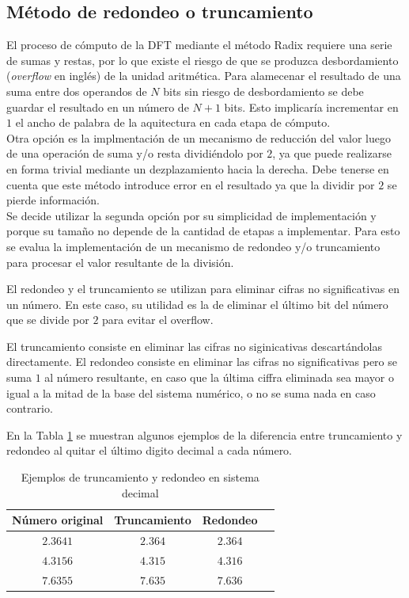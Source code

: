 \subsection{Método de redondeo o truncamiento} \label{sec:redond}

El proceso de cómputo de la DFT mediante el método Radix requiere una serie
de sumas y restas, por lo que existe el riesgo de que se produzca desbordamiento (\textit{overflow}
en inglés) de la unidad aritmética. Para alamecenar el resultado de una suma entre dos operandos de $N$ bits
sin riesgo de desbordamiento se debe guardar el resultado en un número de $N+1$ bits. Esto
implicaría incrementar en $1$ el ancho de palabra de la aquitectura en cada etapa de cómputo.\\ 
Otra opción es la implmentación de un mecanismo de reducción del valor luego de una operación de suma y/o
resta dividiéndolo por $2$, ya que puede realizarse en forma trivial mediante un dezplazamiento
hacia la derecha. Debe tenerse en cuenta que este método introduce error en el resultado ya que la
dividir por $2$ se pierde información.\\
Se decide utilizar la segunda opción por su simplicidad de implementación y porque su tamaño no
depende de la cantidad de etapas a implementar. Para esto se evalua la implementación de un
mecanismo de redondeo y/o truncamiento para procesar el valor resultante de la división.

El redondeo y el truncamiento se utilizan para eliminar cifras no significativas en un número. En
este caso, su utilidad es la de eliminar el último bit del número que se divide por $2$ para
evitar el overflow.

El truncamiento consiste en eliminar las cifras no siginicativas descartándolas directamente.
El redondeo consiste en eliminar las cifras no significativas pero se suma $1$ al número resultante,
en caso que la última ciffra eliminada sea mayor o igual a la mitad de la base del sistema numérico, 
o no se suma nada en caso contrario.

En la Tabla \ref{table:redond} se muestran algunos ejemplos de la diferencia entre truncamiento y
redondeo al quitar el último digito decimal a cada número.

\begin{table}[htb!]
\centering
\begin{tabular}{c c c c}
\textbf{Número original} & \textbf{Truncamiento} & \textbf{Redondeo} \\ \hline 
$2.3641$ & $2.364$ & $2.364$ \\
$4.3156$ & $4.315$ & $4.316$ \\
$7.6355$ & $7.635$ & $7.636$ \\ \hline
\end{tabular}
\caption{Ejemplos de truncamiento y redondeo en sistema decimal}
\label{table:redond}
\end{table}

